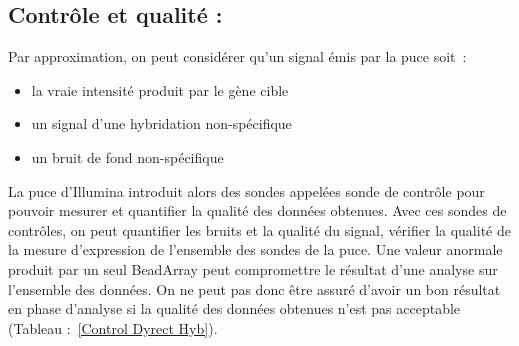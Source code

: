 \documentclass[a4paper,10pt]{article}
\begin{document}
\subsection{ Contrôle et qualité :}
Par approximation, on peut considérer qu’un signal émis par la puce soit :
\begin{itemize}
 \item la vraie intensité produit par le gène cible
 \item un signal d’une hybridation non-spécifique
 \item un bruit de fond non-spécifique
\end{itemize}
La puce d’Illumina introduit alors des sondes appelées sonde de contrôle pour pouvoir mesurer et quantifier la qualité des données obtenues.
Avec ces sondes de contrôles, on peut quantifier les bruits et la qualité du signal, vérifier la qualité de la mesure d’expression de l'ensemble des sondes de la puce. 
Une valeur anormale produit par un seul BeadArray peut compromettre le résultat d’une analyse sur l’ensemble des données. 
On ne peut pas donc être assuré d’avoir un bon résultat en phase d’analyse si la qualité des données obtenues n’est pas acceptable (Tableau :~\ref{Control Dyrect  Hyb}).
\end{document}
